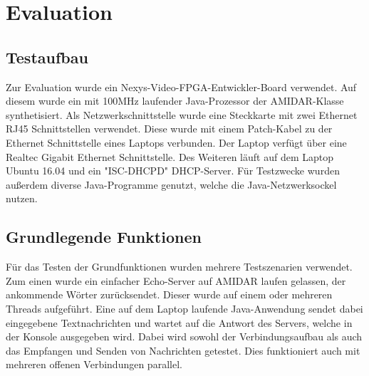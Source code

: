 \chapter{Evaluation}


\section{Testaufbau}

Zur Evaluation wurde ein Nexys-Video-FPGA-Entwickler-Board verwendet. Auf diesem wurde ein mit 100MHz laufender Java-Prozessor der AMIDAR-Klasse synthetisiert. Als Netzwerkschnittstelle wurde eine Steckkarte mit zwei Ethernet RJ45 Schnittstellen verwendet. Diese wurde mit einem Patch-Kabel zu der Ethernet Schnittstelle eines Laptops verbunden. Der Laptop verfügt über eine Realtec Gigabit Ethernet Schnittstelle. Des Weiteren läuft auf dem Laptop Ubuntu 16.04 und ein "{}ISC-DHCPD"{} DHCP-Server. Für Testzwecke wurden außerdem diverse Java-Programme genutzt, welche die Java-Netzwerksockel nutzen. 

\section{Grundlegende Funktionen}

Für das Testen der Grundfunktionen wurden mehrere Testszenarien verwendet. Zum einen wurde ein einfacher Echo-Server auf AMIDAR laufen gelassen, der ankommende Wörter zurücksendet. Dieser wurde auf einem oder mehreren Threads aufgeführt. Eine auf dem Laptop laufende Java-Anwendung sendet dabei eingegebene Textnachrichten und wartet auf die Antwort des Servers, welche in der Konsole ausgegeben wird. Dabei wird sowohl der Verbindungsaufbau als auch das Empfangen und Senden von Nachrichten getestet. Dies funktioniert auch mit mehreren offenen Verbindungen parallel. 



